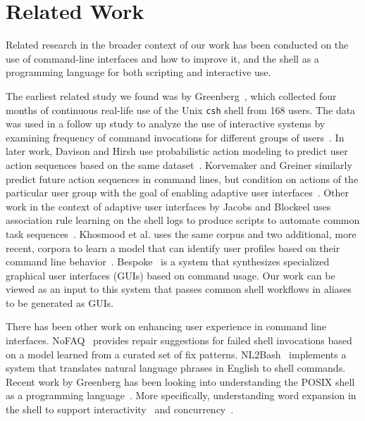 \section{Related Work}

Related research in the broader context of our work has been conducted on the use of command-line interfaces and how to improve it, and the shell as a programming language for both scripting and interactive use. 

The earliest related study we found was by Greenberg~\cite{greenberg:88a}, which collected four months of continuous real-life use of the Unix \verb|csh| shell from 168 users. 
The data was used in a follow up study to analyze the use of interactive systems by examining frequency of command invocations for different groups of users~\cite{greenberg:88b}.
In later work, Davison and Hirsh use probabilistic action modeling to predict user action sequences based on the same dataset~\cite{davison:98}.
Korvemaker and Greiner similarly predict future action sequences in command lines, but condition on actions of the particular user group with the goal of enabling adaptive user interfaces~\cite{korvemaker:00}.
Other work in the context of adaptive user interfaces by Jacobs and Blockeel uses association rule learning on the shell logs to produce scripts to automate common task sequences~\cite{jacobs:01}.
Khosmood et al. uses the same corpus and two additional, more recent, corpora to learn a model that can identify user profiles based on their command line behavior~\cite{khosmood:14}.
Bespoke~\cite{bespoke:19} is a system that synthesizes specialized graphical user interfaces (GUIs) based on command usage.
Our work can be viewed as an input to this system that passes common shell workflows in aliases to be generated as GUIs.

There has been other work on enhancing user experience in command line interfaces.
NoFAQ~\cite{dantoni:17} provides repair suggestions for failed shell invocations based on a model learned from a curated set of fix patterns.
NL2Bash~\cite{lin:18} implements a system that translates natural language phrases in English to shell commands.
Recent work by Greenberg has been looking into understanding the POSIX shell as a programming language~\cite{greenberg:17}.
More specifically, understanding word expansion in the shell to support interactivity~\cite{greenberg:18a} and concurrency~\cite{greenberg:18b}.
